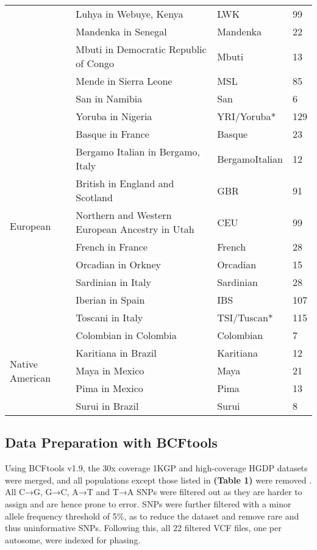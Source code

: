 \documentclass[11pt]{article}
\begin{document}
\begin{table}[htb]
\begin{tabular}{ |p{3cm}||p{8cm}|p{3cm}|p{0.8cm}|  }
        &Luhya in Webuye, Kenya & LWK & 99 \\
        &Mandenka in Senegal & Mandenka & 22 \\
        &Mbuti in Democratic Republic of Congo & Mbuti & 13 \\
        &Mende in Sierra Leone & MSL & 85 \\
        &San in Namibia & San & 6 \\
        &Yoruba in Nigeria & YRI/Yoruba* & 129 \\
    \hline
    \multirow{9}{*}{European}
        &Basque in France & Basque & 23 \\
        &Bergamo Italian in Bergamo, Italy & BergamoItalian & 12 \\
        &British in England and Scotland & GBR & 91 \\
        &Northern and Western European Ancestry in Utah & CEU & 99 \\
        &French in France & French & 28 \\
        &Orcadian in Orkney & Orcadian & 15 \\
        &Sardinian in Italy & Sardinian & 28 \\
        &Iberian in Spain & IBS & 107 \\
        &Toscani in Italy & TSI/Tuscan* & 115 \\
    \hline
    \multirow{5}{*}{Native American}
        &Colombian in Colombia & Colombian & 7 \\
        &Karitiana in Brazil & Karitiana & 12 \\
        &Maya in Mexico & Maya & 21 \\
        &Pima in Mexico & Pima & 13 \\
        &Surui in Brazil & Surui & 8 \\
    \hline
    \end{tabular}
\end{table}





\subsection{Data Preparation with BCFtools}

Using BCFtools v1.9, the 30x coverage 1KGP and high-coverage HGDP datasets were merged, and all populations except those listed in \textbf{(Table 1)} were removed \parencite{Danecek2021}. All C→G, G→C, A→T and T→A SNPs were filtered out as they are harder to assign and are hence prone to error. SNPs were further filtered with a minor allele frequency threshold of 5\%, as to reduce the dataset and remove rare and thus uninformative SNPs. Following this, all 22 filtered VCF files, one per autosome, were indexed for phasing. 
\end{document}
